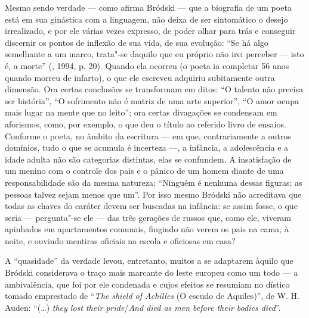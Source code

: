 Mesmo sendo verdade --- como afirma Bródski --- que a biografia de um poeta
está em sua ginástica com a linguagem, não deixa de ser sintomático o
desejo irrealizado, e por ele várias vezes expresso, de poder olhar para
trás e conseguir discernir os pontos de inflexão de sua vida, de sua
evolução: ``Se há algo semelhante a um marco, trata"-se daquilo que
eu próprio não irei perceber --- isto é, a morte'' (, 1994, p. 20). Quando ela
ocorreu (o poeta ia completar 56 anos quando morreu de infarto), o que
ele escreveu adquiriu subitamente outra dimensão. Ora certas conclusões
se transformam em ditos: ``O talento não precisa ser história'', ``O
sofrimento não é matriz de uma arte superior'', ``O amor ocupa mais
lugar na mente que no leito''; ora certas divagações se condensam em
aforismos, como, por exemplo, o que deu o título ao referido
livro de ensaios. Conforme o poeta, no âmbito da escritura --- em que,
contrariamente a outros domínios, tudo o que se acumula é incerteza ---, a
infância, a adolescência e a idade adulta não são categorias distintas,
elas se confundem. A insatisfação de um menino com o controle dos pais e
o pânico de um homem diante de uma responsabilidade são da mesma
natureza: ``Ninguém é nenhuma dessas figuras; as pessoas talvez sejam
menos que um''. Por isso mesmo Bródski não acreditava que todas as chaves do
caráter devem ser buscadas na infância: se assim fosse, o que seria ---
pergunta"-se ele --- das três gerações de russos que, como ele, viveram
apinhados em apartamentos comunais, fingindo não verem os pais na cama,
à noite, e ouvindo mentiras oficiais na escola e oficiosas em casa?

A ``quasidade'' da verdade levou, entretanto, muitos a se adaptarem
àquilo que Bródski considerava o traço mais marcante do leste europeu como
um todo --- a ambivalência, que foi por ele condenada e cujos efeitos se resumiam no
dístico tomado emprestado de ``\emph{The shield of Achilles} (O escudo de Aquiles)'', de W. H.
Auden: ``(\ldots{}) \emph{they lost their pride}/\emph{And died as men before their
bodies died}''.

